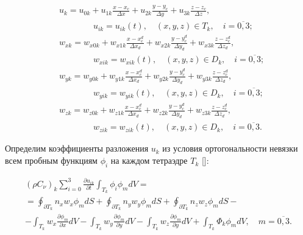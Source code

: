 \begin{align}

&

u_k=u_{0k}+u_{1k}\frac{x-x_c}{\Delta x}+u_{2k}\frac{y-y_c}{\Delta y}+u_{3k}\frac{z-z_c}{\Delta z}, \\

& \qquad\qquad u_{ik}=u_{ik}\left( t\right), \quad  ( x, y, z )\in T_k, \quad i=\overline{0, 3}; 

\\

&

w_{xk}=w_{x0k}+w_{x1k}\frac{x-x^d_c}{\Delta x_d}+w_{x2k}\frac{y-y^d_c}{\Delta y_d}+w_{x3k}\frac{z-z^d_c}{\Delta z_d},\\

&  \qquad\qquad w_{xik}=w_{xik}\left( t\right),\quad ( x, y, z )\in D_k, \quad i=\overline{0, 3}; 

\\

&w_{yk}=w_{y0k}+w_{y1k}\frac{x-x^d_c}{\Delta x_d}+w_{y2k}\frac{y-y^d_c}{\Delta y_d}+w_{y3k}\frac{z-z^d_c}{\Delta z_d},\\

&  \qquad\qquad w_{yik}=w_{yik}\left( t\right),\quad ( x, y, z )\in D_k, \quad i=\overline{0, 3};

\\

&

w_{zk}=w_{z0k}+w_{z1k}\frac{x-x^d_c}{\Delta x_d}+w_{z2k}\frac{y-y^d_c}{\Delta y_d}+w_{z3k}\frac{z-z^d_c}{\Delta z_d},\\

&  \qquad\qquad w_{zik}=w_{zik}\left( t\right),\quad ( x, y, z )\in D_k, \quad i=\overline{0, 3}.

\end{align}



Определим коэффициенты разложения $u_k$ из условия ортогональности невязки всем пробным функциям $\phi_i$ на каждом тетраэдре $T_k$ []:

\begin{multline}

(\rho C_\nu)_k \sum_{i=0}^3 \frac{\partial u_{ik}}{\partial t} \int _{T_k} \phi_i\phi_m dV= 

\\

= \oint _{\partial T_k} n_x w_x \phi_m dS + \oint _{\partial T_k} n_y w_y \phi_m dS + \oint _{\partial T_k} n_z w_z \phi_m dS -

\\ -\int _{T_k} w_x \frac{\partial \phi_m}{\partial x} dV

-\int _{T_k} w_y \frac{\partial \phi_m}{\partial y} dV -\int _{T_k} w_z \frac{\partial \phi_m}{\partial y} dV + \int _{T_k} \Phi_k\phi_m dV, \quad m = \overline{0, 3}.

\label{eq:mas:SystemTetrahedron}

\end{multline}

